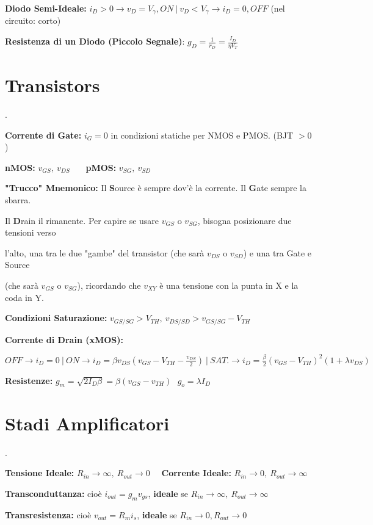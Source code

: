 \documentclass[12pt]{extarticle}
\begin{document}
{\bf Diodo Semi-Ideale:} $i_D > 0 \to v_D = V_\gamma, ON \ \big | \ v_D < V_\gamma \to i_D = 0, OFF$ (nel circuito: corto)

{\bf Resistenza di un Diodo (Piccolo Segnale)}: $\displaystyle g_D = \frac{1}{r_D} = \frac{I_D}{\eta V_T}$

\section{Transistors}.

{\bf Corrente di Gate:} $i_G = 0$ in condizioni statiche per NMOS e PMOS. (BJT $> 0$)

{\bf nMOS:} $\displaystyle v_{GS}, \ v_{DS}$ \ \ \ {\bf pMOS:} $\displaystyle v_{SG}, \ v_{SD}$

{\bf "Trucco" Mnemonico:} Il {\bf S}ource è sempre dov'è la corrente. Il {\bf G}ate sempre la sbarra.

Il {\bf D}rain il rimanente. Per capire se usare $v_{GS}$ o $v_{SG}$, bisogna posizionare due tensioni verso

l'alto, una tra le due "gambe" del transistor (che sarà $v_{DS}$ o $v_{SD}$) e una tra Gate e Source

(che sarà $v_{GS}$ o $v_{SG}$), ricordando che $v_{XY}$ è una tensione con la punta in X e la coda in Y.

{\bf Condizioni Saturazione:} $\displaystyle v_{GS/SG} > V_{TH}, \ v_{DS/SD} > v_{GS/SG} - V_{TH} $

{\bf Corrente di Drain (xMOS):} 

$\displaystyle OFF \to i_D = 0 \ \big | \  ON \to i_D = \beta v_{DS}(v_{GS}-V_{TH}-\frac{v_{DS}}{2}) \ \big | \ SAT. \to i_D = \frac{\beta}{2}(v_{GS}-V_{TH})^2(1+\lambda v_{DS})$

{\bf Resistenze:} $\displaystyle g_m = \sqrt{2I_D\beta} = \beta(v_{GS}-v_{TH})\ \ \ g_o = \lambda I_D$

\section{Stadi Amplificatori}.

{\bf Tensione Ideale:} $R_{in} \to \infty, \ R_{out} \to 0 $ \ \ {\bf Corrente Ideale:} $R_{in} \to 0, \ R_{out} \to \infty $ 

{\bf Transconduttanza:} cioè $ i_{out} = g_mv_{gs} $, {\bf ideale} se $R_{in} \to \infty, \ R_{out} \to \infty$

{\bf Transresistenza:} cioè $ v_{out} = R_mi_s$, {\bf ideale} se $R_{in} \to 0, R_{out} \to 0$ 
\end{document}
